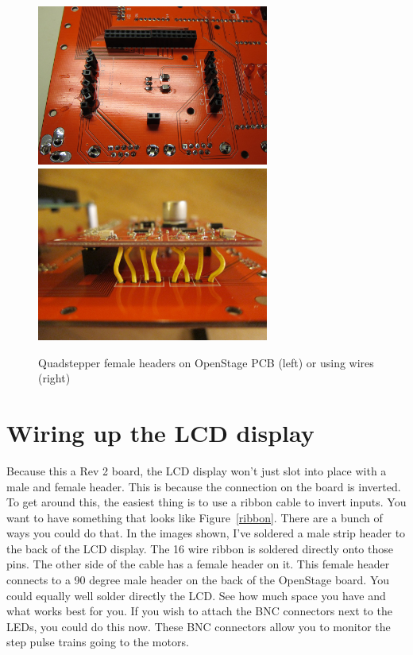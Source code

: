\documentclass[11pt]{report} %
\begin{document}
\begin{figure}[!ht]
\centering
\includegraphics[width=3in]{IMG_3211.JPG}
\includegraphics[width=3in]{IMG_3232.JPG}
\caption{Quadstepper female headers on OpenStage PCB (left) or using wires (right) }
\label{motoroutputs}
\end{figure}


\clearpage

\section{Wiring up the LCD display}
Because this a Rev 2 board, the LCD display won't just slot into place with a male and female header. This is because the connection on the board is inverted. To get around this, the easiest thing is to use a ribbon cable to invert inputs. You want to have something that looks like Figure~\ref{ribbon}. There are a bunch of ways you could do that. In the images shown, I've soldered a male strip header to the back of the LCD display. The 16 wire ribbon is soldered directly onto those pins. The other side of the cable has a female header on it. This female header connects to a 90 degree male header on the back of the OpenStage board. You could equally well solder directly the LCD. See how much space you have and what works best for you. If you wish to attach the BNC connectors next to the LEDs, you could do this now. These BNC connectors allow you to monitor the step pulse trains going to the motors.
\end{document}
